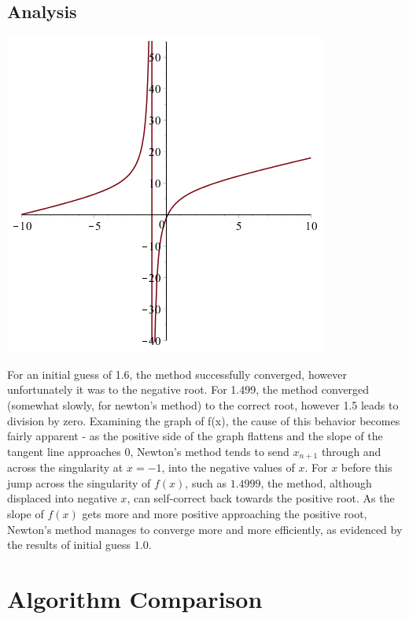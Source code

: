 \documentclass[11pt]{article} %
\begin{document}
\subsection*{Analysis}
\includegraphics[scale=.5]{plots/newtongraph1.png}


\par For an initial guess of 1.6, the method successfully converged, however unfortunately it was to the negative root. For 1.499, the method converged (somewhat slowly, for newton's method) to the correct root, however 1.5 leads to division by zero. Examining the graph of f(x), the cause of this behavior becomes fairly apparent - as the positive side of the graph flattens and the slope of the tangent line approaches $0$, Newton's method tends to send $x_{n+1}$ through and across the singularity at $x = -1$, into the negative values of $x$. For $x$ before this jump across the singularity of $f(x)$, such as $1.4999$, the method, although displaced into negative $x$, can self-correct back towards the positive root. As the slope of $f(x)$ gets more and more positive approaching the positive root, Newton's method manages to converge more and more efficiently, as evidenced by the results of initial guess $1.0$.

\newpage
\section*{Algorithm Comparison}
\end{document}
